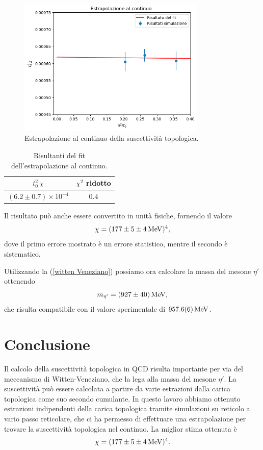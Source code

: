 \documentclass{article}
\numberwithin{equation}{subsection}
\begin{document}
\begin{figure}[h]
    \centering
    \includegraphics[width=0.8\textwidth]{images/estrapolazione.png}
    \caption{Estrapolazione al continuo della suscettività topologica.}
    \label{fig:estrapolazione}
\end{figure}

\begin{table}[h]
    \centering
    \begin{tabular}{||c c||} 
     \hline
     $t_0^2 \,\chi$ & $\chi^2$ ridotto \\[0.5ex] 
     \hline\hline
     $(6.2\pm0.7)\times 10^{-4}$ & $0.4$ \\[1ex] 
     \hline
    \end{tabular}
    \caption{Risultanti del fit dell'estrapolazione al continuo.}
    \label{tab:estrapolazione}
\end{table}



Il risultato può anche essere convertito in unità fisiche, fornendo il valore
\begin{equation}
    \chi=(177\pm5\pm4\,\textup{MeV})^4,
\end{equation}
dove il primo errore mostrato è un errore statistico, mentre il secondo è sistematico. 

Utilizzando la (\ref{witten Veneziano}) possiamo ora calcolare la massa del mesone $\eta'$ ottenendo 
\begin{equation}
    m_{\eta'}=(927  \pm  40)\,\textup{MeV},
\end{equation}
che risulta compatibile con il valore sperimentale di $957.6(6)\,\textup{MeV}$.


\section{Conclusione}
Il calcolo della suscettività topologica in QCD risulta importante per via del meccanismo di Witten-Veneziano, che la lega alla massa del mesone $\eta'$. La suscettività può essere calcolata a partire da varie estrazioni dalla carica topologica come suo secondo cumulante. In questo lavoro abbiamo ottenuto estrazioni indipendenti della carica topologica tramite simulazioni su reticolo a vario passo reticolare, che ci ha permesso di effettuare una estrapolazione per trovare la suscettività topologica nel continuo. La miglior stima ottenuta è $$\chi=(177\pm5\pm4\,\textup{MeV})^4.$$
\end{document}
